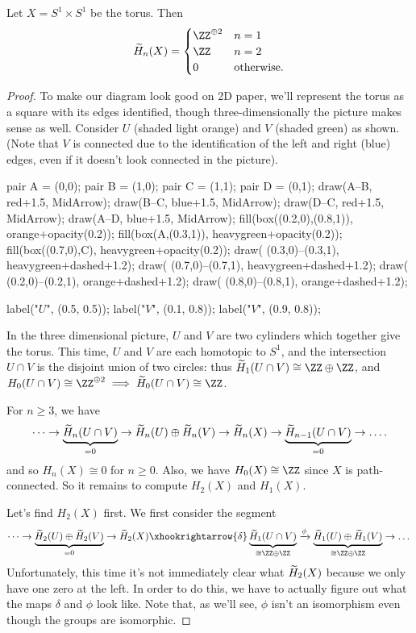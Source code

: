 \begin{proposition}
	Let $X = S^1 \times S^1$ be the torus.
	Then
	\[
		\wt H_n(X)
		=
		\begin{cases}
			\ZZ^{\oplus 2} & n = 1 \\
			\ZZ & n = 2 \\
			0 & \text{otherwise}.
		\end{cases}
	\]
\end{proposition}
\begin{proof}
	To make our diagram look good on 2D paper,
	we'll represent the torus as a square with its edges identified,
	though three-dimensionally the picture makes sense as well.
	Consider $U$ (shaded light orange) and $V$ (shaded green) as shown.
	(Note that $V$ is connected due to the identification of the left and right (blue) edges,
	even if it doesn't look connected in the picture).
	\begin{center}
		\begin{asy}
			pair A = (0,0);
			pair B = (1,0);
			pair C = (1,1);
			pair D = (0,1);
			draw(A--B, red+1.5, MidArrow);
			draw(B--C, blue+1.5, MidArrow);
			draw(D--C, red+1.5, MidArrow);
			draw(A--D, blue+1.5, MidArrow);
			fill(box((0.2,0),(0.8,1)), orange+opacity(0.2));
			fill(box(A,(0.3,1)), heavygreen+opacity(0.2));
			fill(box((0.7,0),C), heavygreen+opacity(0.2));
			draw( (0.3,0)--(0.3,1), heavygreen+dashed+1.2);
			draw( (0.7,0)--(0.7,1), heavygreen+dashed+1.2);
			draw( (0.2,0)--(0.2,1), orange+dashed+1.2);
			draw( (0.8,0)--(0.8,1), orange+dashed+1.2);

			label("$U$", (0.5, 0.5));
			label("$V$", (0.1, 0.8));
			label("$V$", (0.9, 0.8));
		\end{asy}
	\end{center}
	In the three dimensional picture, $U$ and $V$ are two cylinders which together give the torus.
	This time, $U$ and $V$ are each homotopic to $S^1$, and the intersection $U \cap V$
	is the disjoint union of two circles: thus $\wt H_1(U \cap V) \cong \ZZ \oplus \ZZ$,
	and $H_0(U \cap V) \cong \ZZ^{\oplus 2} \implies \wt H_0(U \cap V) \cong \ZZ$.

	For $n \ge 3$, we have
	\[ 
		\dots \to
		\underbrace{\widetilde H_n(U \cap V)}_{=0}
		\to \widetilde H_n(U) \oplus \widetilde H_n(V) \to \widetilde H_n(X) \to 
		\underbrace{\widetilde H_{n-1}(U \cap V)}_{=0} \to \dots.
	\]
	and so $H_n(X) \cong 0$ for $n \ge 0$.
	Also, we have $H_0(X) \cong \ZZ$ since $X$ is path-connected.
	So it remains to compute $H_2(X)$ and $H_1(X)$.

	Let's find $H_2(X)$ first.
	We first consider the segment
	\[ 
		\dots \to
		\underbrace{\wt H_2(U) \oplus \wt H_2(V)}_{=0} \to \wt H_2(X) \xhookrightarrow{\delta}
		\underbrace{\wt H_1(U \cap V)}_{\cong \ZZ \oplus \ZZ} \xrightarrow{\phi}
		\underbrace{\wt H_1(U) \oplus \wt H_1(V)}_{\cong \ZZ \oplus \ZZ} \to \dots
	\]
	Unfortunately, this time it's not immediately clear what $\widetilde H_2(X)$ because
	we only have one zero at the left.
	In order to do this, we have to actually figure out what the maps $\delta$ and $\phi$ look like.
	Note that, as we'll see, $\phi$ isn't an isomorphism even though the groups are isomorphic.


\end{proof}
